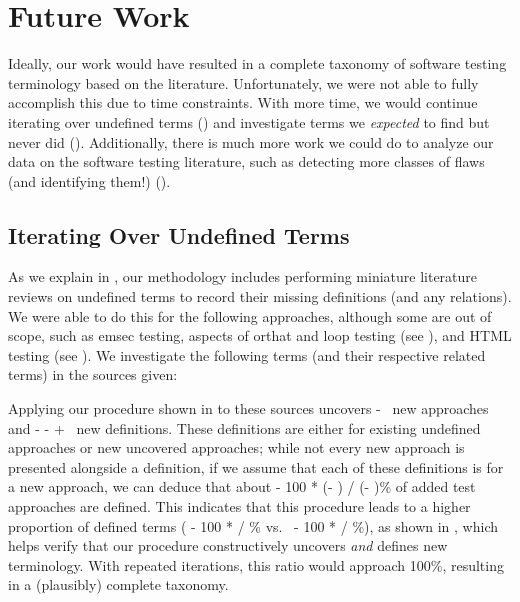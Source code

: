 \section{Future Work}\label{future-work}

Ideally, our work would have resulted in a complete taxonomy of software
testing terminology based on the literature. Unfortunately, we were not able to
fully accomplish this due to time constraints. With more time, we would
continue iterating over undefined terms () and
investigate terms we \emph{expected} to find but never did
(). Additionally, there is much more work we could do
to analyze our data on the software testing literature, such as detecting
more classes of flaws (and identifying them!) ().

\subsection{Iterating Over Undefined Terms}\label{future-undef-terms}

As we explain in , our methodology includes performing
miniature literature reviews on undefined terms to record their
missing definitions (and any relations). We were able to do this for the
following approaches, although some are out of scope, such as \acf{emsec}
testing, aspects of \acf{orthat} and loop testing (see ),
and HTML testing (see ). We investigate the following terms
(and their respective related terms) in the sources given:


Applying our procedure shown in  to these sources
uncovers \the\numexpr \TotalAfter - \TotalBefore\relax\ new approaches and
\the\numexpr \TotalAfter - \UndefAfter - \TotalBefore + \UndefBefore\relax\ new
definitions. These definitions are either for existing undefined approaches or
new uncovered approaches; while not every new approach is presented alongside
a definition, if we assume that each of these definitions is for a new approach,
we can deduce that about \the{} - 100 * (\UndefAfter - \UndefBefore) /
(\TotalAfter - \TotalBefore)\relax\% of added test approaches are defined. This
indicates that this procedure leads to a higher proportion of defined terms
(\the{} - 100 * \UndefBefore / \TotalBefore\relax\% vs.~%
\the{} - 100 * \UndefAfter / \TotalAfter\relax\%), as shown in
, which helps verify that our procedure constructively
uncovers \emph{and} defines new terminology. With repeated iterations, this
ratio would approach 100\%, resulting in a (plausibly) complete taxonomy.

